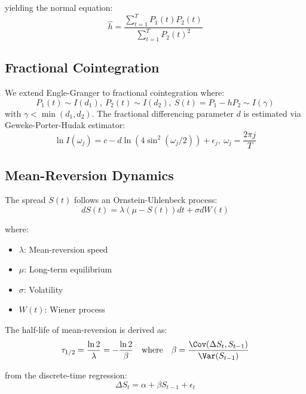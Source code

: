 \documentclass[12pt]{article}
\begin{document}
yielding the normal equation:
\begin{equation}
\hat{h} = \frac{\sum_{t=1}^T P_1(t)P_2(t)}{\sum_{t=1}^T P_2(t)^2}
\end{equation}

\subsection{Fractional Cointegration}
We extend Engle-Granger to fractional cointegration where:
\begin{equation}
P_1(t) \sim I(d_1), \ P_2(t) \sim I(d_2), \ S(t) = P_1 - hP_2 \sim I(\gamma)
\end{equation}
with $\gamma < \min(d_1,d_2)$. The fractional differencing parameter $d$ is estimated via Geweke-Porter-Hudak estimator:
\begin{equation}
\ln I(\omega_j) = c - d\ln\left(4\sin^2(\omega_j/2)\right) + \epsilon_j, \ \omega_j = \frac{2\pi j}{T}
\end{equation}

\subsection{Mean-Reversion Dynamics}

The spread $S(t)$ follows an Ornstein-Uhlenbeck process:
\begin{equation}
dS(t) = \lambda(\mu - S(t))dt + \sigma dW(t)
\end{equation}

where:
\begin{itemize}
    \item $\lambda$: Mean-reversion speed
    \item $\mu$: Long-term equilibrium
    \item $\sigma$: Volatility
    \item $W(t)$: Wiener process
\end{itemize}

The half-life of mean-reversion is derived as:
\begin{equation}
\tau_{1/2} = \frac{\ln 2}{\lambda} = -\frac{\ln 2}{\beta} \quad \text{where} \quad \beta = \frac{\Cov(\Delta S_t, S_{t-1})}{\Var(S_{t-1})}
\end{equation}

from the discrete-time regression:
\begin{equation}
\Delta S_t = \alpha + \beta S_{t-1} + \epsilon_t
\end{equation}
\end{document}

